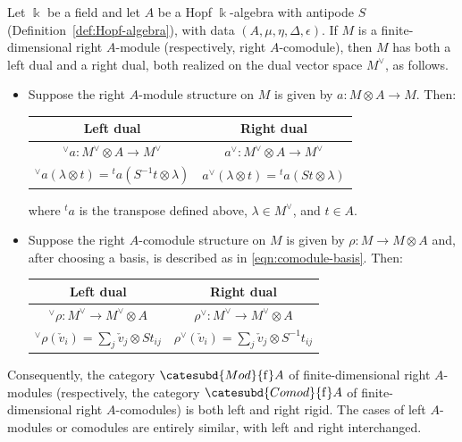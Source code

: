 \begin{proposition}\label{prop:Hopf-module-dual}
	Let $\Bbbk$ be a field and let $A$ be a Hopf $\Bbbk$-algebra with
	antipode $S$ (Definition~\ref{def:Hopf-algebra}), with data
	$(A,\mu,\eta,\Delta,\epsilon)$. If $M$ is a finite-dimensional right
	$A$-module (respectively, right $A$-comodule), then $M$ has both a left
	dual and a right dual, both realized on the dual vector space $M^\vee$, as
	follows.
	\begin{itemize}
		\item Suppose the right $A$-module structure on $M$ is given by
		$a:M\otimes A\to M$. Then:
		\begin{center}\begin{tabular}{|c|c|} \hline
			Left dual & Right dual \\ \hline
			${}^\vee a: M^\vee \otimes A \to M^\vee$ & $a^\vee: M^\vee \otimes A \to M^\vee$ \\
			${}^\vee a(\lambda \otimes t) = {}^t a\left( S^{-1} t \otimes \lambda\right)$ & $a^\vee(\lambda \otimes t) = {}^t a\left(St \otimes \lambda \right)$
			\\ \hline
		\end{tabular}\end{center}
		where ${}^ta$ is the transpose defined above, $\lambda\in M^\vee$, and
		$t\in A$.
		\item Suppose the right $A$-comodule structure on $M$ is given by
		$\rho:M\to M\otimes A$ and, after choosing a basis, is described as in
		\eqref{eqn:comodule-basis}. Then:
		\begin{center}\begin{tabular}{|c|c|} \hline
			Left dual & Right dual \\ \hline
			${}^\vee \rho: M^\vee \to M^\vee \otimes A$ & $\rho^\vee: M^\vee \to M^\vee \otimes A$ \\
			${}^\vee \rho (\check{v}_i) = \sum_j \check{v}_j \otimes St_{ij}$ & $\rho^\vee (\check{v}_i) = \sum_j \check{v}_j \otimes S^{-1} t_{ij}$
			\\ \hline
		\end{tabular}\end{center}
	\end{itemize}

	Consequently, the category $\catesubd{Mod}{\mathrm f}A$ of
	finite-dimensional right $A$-modules (respectively, the category
	$\catesubd{Comod}{\mathrm f}A$ of finite-dimensional right $A$-comodules)
	is both left and right rigid. The cases of left $A$-modules or comodules
	are entirely similar, with left and right interchanged.
\end{proposition}

